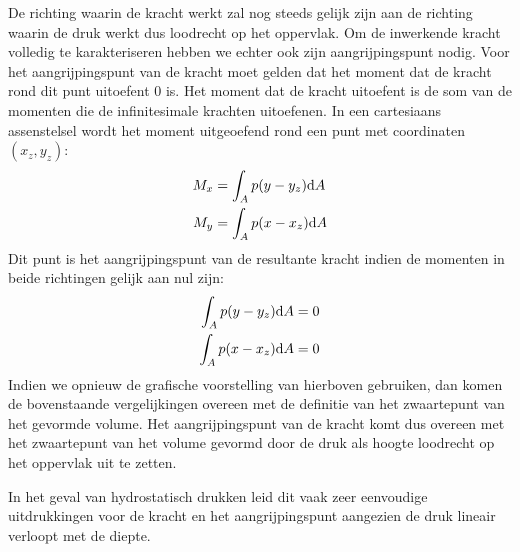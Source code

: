 De richting waarin de kracht werkt zal nog steeds gelijk zijn aan de richting waarin de druk werkt dus loodrecht op het oppervlak. Om de inwerkende kracht volledig te karakteriseren hebben we echter ook zijn aangrijpingspunt nodig. Voor het aangrijpingspunt van de kracht moet gelden dat het moment dat de kracht rond dit punt uitoefent 0 is. Het moment dat de kracht uitoefent is de som van de momenten die de infinitesimale krachten uitoefenen. In een cartesiaans assenstelsel wordt het moment uitgeoefend rond een punt met coordinaten $(x_z,y_z)$:
\begin{align}
	M_x &= \int_A  p (y-y_z)  \mathrm{d} A \\
	M_y &= \int_A  p (x-x_z)  \mathrm{d} A
\end{align}
Dit punt is het aangrijpingspunt van de resultante kracht indien de momenten in beide richtingen gelijk aan nul zijn:
\begin{align}
	\int_A  p (y-y_z)  \mathrm{d} A = 0 \\
	\int_A  p (x-x_z)  \mathrm{d} A = 0
\end{align}
Indien we opnieuw de grafische voorstelling van hierboven gebruiken, dan komen de bovenstaande vergelijkingen overeen met de definitie van het zwaartepunt van het gevormde volume. Het aangrijpingspunt van de kracht komt dus overeen met het zwaartepunt van het volume gevormd door de druk als hoogte loodrecht op het oppervlak uit te zetten.

In het geval van hydrostatisch drukken leid dit vaak zeer eenvoudige uitdrukkingen voor de kracht en het aangrijpingspunt aangezien de druk lineair verloopt met de diepte.

